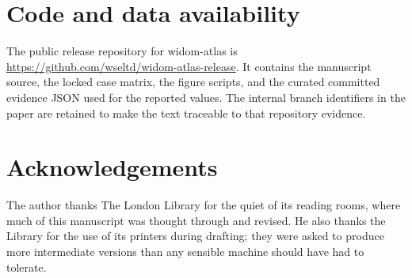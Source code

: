 \documentclass[11pt,a4paper]{article}
\begin{document}
\begin{abstract}
out-of-distribution demonstration on machine-learned potentials that discriminates over-binding from absent-well failure, screen-passes a dispersion-corrected route for the latter, and withholds a verdict on a foundation model used outside its training domain. widom-atlas is therefore not scientifically validated as a general predictive adsorption tool. It is a reproducible way to decide whether a particular Widom adsorption number is a trustworthy zero-coverage observable or merely the output of an untested recipe.
\end{abstract}











\appendix






\section*{Code and data availability}

The public release repository for widom-atlas is \url{https://github.com/wseltd/widom-atlas-release}. It contains the manuscript source, the locked case matrix, the figure scripts, and the curated committed evidence JSON used for the reported values. The internal branch identifiers in the paper are retained to make the text traceable to that repository evidence.

\section*{Acknowledgements}

The author thanks The London Library for the quiet of its reading rooms, where much of this manuscript was thought through and revised. He also thanks the Library for the use of its printers during drafting; they were asked to produce more intermediate versions than any sensible machine should have had to tolerate.

\FloatBarrier
\clearpage


\end{document}
